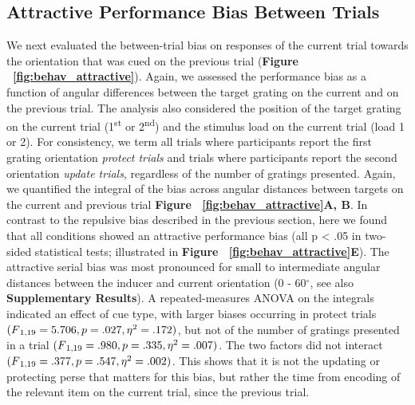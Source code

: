 \documentclass{article}
\begin{document}
\subsection{Attractive Performance Bias Between Trials}
We next evaluated the between-trial bias on responses of the current trial towards the orientation that was cued on the previous trial (\textbf{Figure ~\ref{fig:behav_attractive}}). Again, we assessed the performance bias as a function of angular differences between the target grating on the current and on the previous trial. The analysis also considered the position of the target grating on the current trial (1\textsuperscript{st} or 2\textsuperscript{nd}) and the stimulus load on the current trial (load 1 or 2). For consistency, we term all trials where participants report the first grating orientation \textit{protect trials} and trials where participants report the second orientation \textit{update trials}, regardless of the number of gratings presented. Again, we quantified the integral of the bias across angular distances between targets on the current and previous trial \textbf{Figure ~\ref{fig:behav_attractive}A, B}. In contrast to the repulsive bias described in the previous section, here we found that all conditions showed an attractive performance bias (all p < .05 in two-sided statistical tests; illustrated in \textbf{Figure ~\ref{fig:behav_attractive}E}). The attractive serial bias was most pronounced for small to intermediate angular distances between the inducer and current orientation (0 - 60$^{\circ}$, see also \textbf{Supplementary Results}). A repeated-measures ANOVA on the integrals indicated an effect of cue type, with larger biases occurring in protect trials $(F\textsubscript{1,19}  = 5.706, p = .027, \eta\textsuperscript{2} = .172)$, but not of the number of gratings presented in a trial $(F\textsubscript{1,19}  = .980, p = .335, \eta\textsuperscript{2} = .007)$. The two factors did not interact $(F\textsubscript{1,19}  = .377, p = .547, \eta\textsuperscript{2} = .002)$. This shows that it is not the updating or protecting perse that matters for this bias, but rather the time from encoding of the relevant item on the current trial, since the previous trial.
\end{document}

